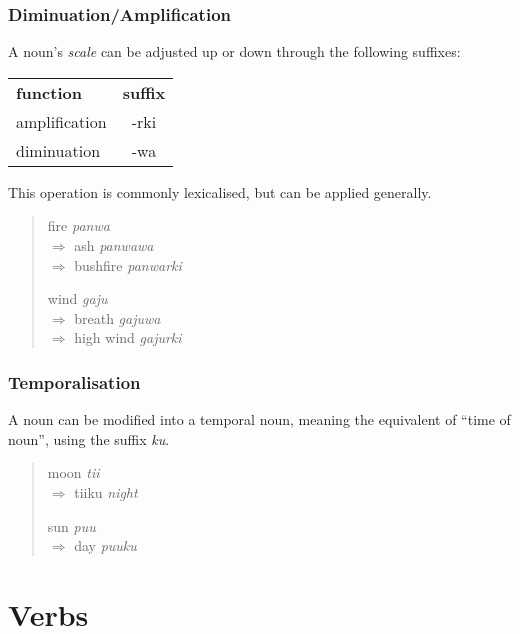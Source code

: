 \subsubsection{Diminuation/Amplification}

A noun's \textit{scale} can be adjusted up or down through the following suffixes:

\begin{table}[h]
  \centering
  \begin{tabular}{lc}
    \textbf{function} & \textbf{suffix}\\
    amplification     & -rki\\
    diminuation       & -wa
  \end{tabular}
\end{table}

This operation is commonly lexicalised, but can be applied generally.

\begin{quote}
\begin{multicols}{2}
fire \textit{panwa}\\
$\Rightarrow$ ash \textit{panwawa}\\
$\Rightarrow$ bushfire \textit{panwarki}

wind \textit{gaju}\\
$\Rightarrow$ breath \textit{gajuwa}\\
$\Rightarrow$ high wind \textit{gajurki}
\end{multicols}
\end{quote}

\subsubsection{Temporalisation}

A noun can be modified into a temporal noun, meaning the equivalent of ``time of noun'', using the suffix \textit{ku}.

\begin{quote}
\begin{multicols}{2}
moon \textit{tii}\\
$\Rightarrow$ tiiku \textit{night}

sun \textit{puu}\\
$\Rightarrow$ day \textit{puuku}\\
\end{multicols}
\end{quote}

\section{Verbs}

